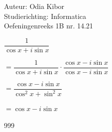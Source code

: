 \documentclass[a4paper]{article}
\begin{document}
  
\noindent \large Auteur: Odia Kibor \\
\noindent \large Studierichting: Informatica\\
\noindent \large Oefeningenreeks 1B nr. 14.21\\

\medskip

\normalsize

$\dfrac{1}{\cos x + i\sin x}$

$= \dfrac{1}{\cos x + i\sin x} \cdot \dfrac{\cos x - i\sin x}{\cos x - i\sin x}$

$= \dfrac{\cos x - i\sin x}{\cos^2 x + \sin^2 x}$

$= \cos x - i\sin x$




\begin{thebibliography}{999}
\end{thebibliography}
\end{document}
